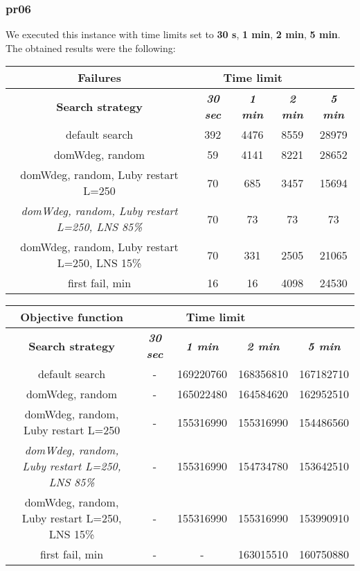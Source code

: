 \subsubsection{pr06}
We executed this instance with time limits set to \textbf{30 s}, \textbf{1 min}, \textbf{2 min}, \textbf{5 min}.\\
The obtained results were the following:
{
\renewcommand{\arraystretch}{2}
\begin{longtable}[h]{| c | c | c | c | c |}
    \hline
    \textbf{Failures} & \multicolumn{3}{c}{Time limit} & \\
    \hline
    \textbf{Search strategy} & \textbf{\textit{30 sec}} & \textbf{\textit{1 min}} & \textbf{\textit{2 min}} & \textbf{\textit{5 min}} \\
    \hline
    \endhead
    default search                                         & 392 & 4476 & 8559 & 28979 \\
    \hline
    domWdeg, random                                        &  59 & 4141 & 8221 & 28652 \\
    \hline
    domWdeg, random, Luby restart L=250                    &  70 &  685 & 3457 & 15694 \\
    \hline
    \textit{domWdeg, random, Luby restart L=250, LNS 85\%} &  70 &   73 &   73 &    73 \\
    \hline
    domWdeg, random, Luby restart L=250, LNS 15\%          &  70 &  331 & 2505 &  21065 \\
    \hline
    first fail, min                                        &  16 &   16 & 4098 &  24530 \\
    \hline
\end{longtable}
}

{
\renewcommand{\arraystretch}{2}
\begin{longtable}[h]{| c | c | c | c | c |}
    \hline
    \textbf{Objective function} & \multicolumn{3}{c}{Time limit} & \\
    \hline
    \textbf{Search strategy} & \textbf{\textit{30 sec}} & \textbf{\textit{1 min}} & \textbf{\textit{2 min}} & \textbf{\textit{5 min}} \\
    \hline
    \endhead
    default search                                         & - & 169220760 & 168356810 & 167182710 \\
    \hline
    domWdeg, random                                        & - & 165022480 & 164584620 & 162952510 \\
    \hline
    domWdeg, random, Luby restart L=250                    & - & 155316990 & 155316990 & 154486560 \\
    \hline
    \textit{domWdeg, random, Luby restart L=250, LNS 85\%} & - & 155316990 & 154734780 & 153642510 \\
    \hline
    domWdeg, random, Luby restart L=250, LNS 15\%          & - & 155316990 & 155316990 & 153990910 \\
    \hline
    first fail, min                                        & - &         - & 163015510 & 160750880 \\
    \hline
\end{longtable}
}